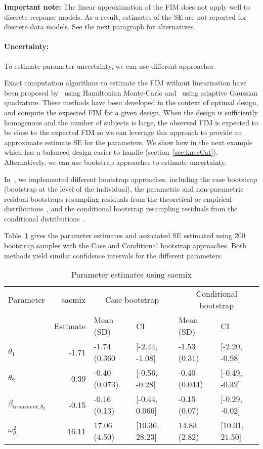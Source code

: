 {\bf Important note:} The linear approximation of the FIM does not apply well to discrete response models. As a result, estimates of the SE are not reported for discrete data models. See the next paragraph for alternatives.

\paragraph{Uncertainty:} To estimate parameter uncertainty, we can use different approaches.

Exact computation algorithms to estimate the FIM without linearisation have been proposed by~\cite{Riviere16} using Hamiltonian Monte-Carlo and~\cite{Ueckert16} using adaptive Gaussian quadrature. These methods have been developed in the context of optimal design, and compute the expected FIM for a given design. When the design is sufficiently homogenous and the number of subjects is large, the observed FIM is expected to be close to the expected FIM so we can leverage this approach to provide an approximate estimate SE for the parameters. We show how in the next example which has a balanced design easier to handle (section~\ref{sec:kneeCat}). Alternatively, we can use bootstrap approaches to estimate uncertainty. 

In~, we implemented different bootstrap approaches, including the case bootstrap (bootstrap at the level of the individual), the parametric and non-parametric residual bootstraps resampling residuals from the theoretical or empirical distributions~\cite{Thai14}, and the conditional bootstrap resampling residuals from the conditional distributions~\cite{Comets21bootstrap}.

Table~\ref{tab:toenailBootstrapSE} gives the parameter estimates and associated SE estimated using 200 bootstrap samples with the Case and Conditional bootstrap approaches. Both methods yield similar confidence intervals for the different parameters.

\begin{table}[!h]
\centering
\begin{tabular}{lrllll}
  \hline
  Parameter & saemix & \multicolumn{2}{c}{Case bootstrap} & \multicolumn{2}{c}{Conditional bootstrap} \\
 &Estimate & Mean (SD) & CI & Mean (SD) & CI \\ 
  \hline
$\theta_1$ & -1.71 & -1.74 (0.360 & [-2.44, -1.08] & -1.53 (0.31) & [-2.20, -0.98] \\ 
 $\theta_2$ & -0.39 & -0.40 (0.073) & [-0.56, -0.28] & -0.40 (0.044) & [-0.49, -0.32] \\ 
 $\beta_{treatment,\theta_2}$ & -0.15 & -0.16 (0.13) & [-0.44, 0.066] & -0.15 (0.07) & [-0.29, -0.02] \\ 
 $\omega^2_{\theta_1}$ & 16.11 & 17.06 (4.50) & [10.36, 28.23] & 14.83 (2.82) & [10.01, 21.50] \\ 
   \hline
\end{tabular}
\caption{Parameter estimates using {\sf saemix}} \label{tab:toenailBootstrapSE}
\end{table}


